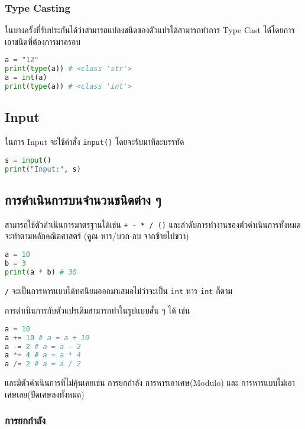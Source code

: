 \subsubsection{Type Casting}

ในบางครั้งที่รับประกันได้ว่าสามารถแปลงชนิดของตัวแปรได้สามารถทำการ Type Cast ได้โดยการเอาชนิดที่ต้องการมาครอบ

\begin{lstlisting}[language=Python]
a = "12"
print(type(a)) # <class 'str'>
a = int(a)
print(type(a)) # <class 'int'>
\end{lstlisting}

\subsection{Input}

ในการ Input จะใช้คำสั่ง \verb|input()| โดยจะรับมาทีละบรรทัด

\begin{lstlisting}[language=Python]
s = input()
print("Input:", s)
\end{lstlisting}

\subsection{การดำเนินการบนจำนวนชนิดต่าง ๆ}

สามารถใช้ตัวดำเนินการมาตรฐานได้เช่น \verb|+ - * / ()| และลำดับการทำงานของตัวดำเนินการทั้งหมดจะทำตามหลักคณิตศาสตร์ (คูณ-หาร/บวก-ลบ จากซ้ายไปขวา)

\begin{lstlisting}[language=Python]
a = 10
b = 3
print(a * b) # 30
\end{lstlisting}

\begin{remark}
    \verb|/| จะเป็นการหารแบบได้ทศนิยมออกมาเสมอไม่ว่าจะเป็น \verb|int| หาร \verb|int| ก็ตาม
\end{remark}

การดำเนินการกับตัวแปรเดิมสามารถทำในรูปแบบสั้น ๆ ได้ เช่น

\begin{lstlisting}[language=Python]
a = 10
a += 10 # a = a + 10
a -= 2 # a = a - 2
a *= 4 # a = a * 4
a /= 2 # a = a / 2
\end{lstlisting}

และมีตัวดำเนินการที่ไม่คุ้นเคยเช่น การยกกำลัง การหารเอาเศษ(Modulo) และ การหารแบบไม่เอาเศษเลย(ปัดเศษลงทั้งหมด)

\subsubsection{การยกกำลัง}

